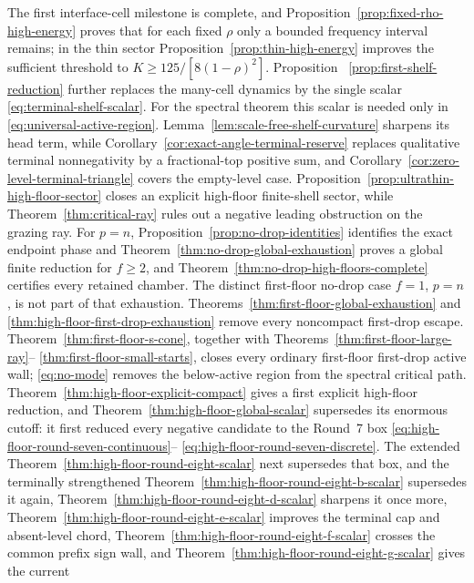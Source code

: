 \documentclass[11pt]{article}
\theoremstyle{remark}
\begin{document}
The first interface-cell milestone is complete, and
Proposition~\ref{prop:fixed-rho-high-energy} proves that for each fixed
$\rho$ only a bounded frequency interval remains; in the thin sector
Proposition~\ref{prop:thin-high-energy} improves the sufficient threshold to
$K\ge 125/[8(1-\rho)^2]$.  Proposition
~\ref{prop:first-shelf-reduction} further replaces the many-cell dynamics
by the single scalar \eqref{eq:terminal-shelf-scalar}.  For the spectral
theorem this scalar is needed only in \eqref{eq:universal-active-region}.
Lemma~\ref{lem:scale-free-shelf-curvature} sharpens its head term, while
Corollary~\ref{cor:exact-angle-terminal-reserve} replaces qualitative
terminal nonnegativity by a fractional-top positive sum, and
Corollary~\ref{cor:zero-level-terminal-triangle} covers the empty-level
case.  Proposition~\ref{prop:ultrathin-high-floor-sector} closes an
explicit high-floor finite-shell sector, while
Theorem~\ref{thm:critical-ray} rules out a negative leading obstruction on
the grazing ray.  For $p=n$, Proposition~\ref{prop:no-drop-identities}
identifies the exact endpoint phase and
 Theorem~\ref{thm:no-drop-global-exhaustion} proves a global finite
 reduction for $f\geq2$, and
 Theorem~\ref{thm:no-drop-high-floors-complete} certifies every retained
 chamber.  The distinct first-floor no-drop case $f=1$, $p=n$, is not part
 of that exhaustion.
 Theorems~\ref{thm:first-floor-global-exhaustion} and
 \ref{thm:high-floor-first-drop-exhaustion} remove every noncompact
 first-drop escape.  Theorem~\ref{thm:first-floor-s-cone}, together with
 Theorems~\ref{thm:first-floor-large-ray}--
 \ref{thm:first-floor-small-starts}, closes every ordinary first-floor
 first-drop active wall; \eqref{eq:no-mode} removes the below-active region from the
 spectral critical path.  Theorem~\ref{thm:high-floor-explicit-compact}
 gives a first explicit high-floor reduction, and
 Theorem~\ref{thm:high-floor-global-scalar} supersedes its enormous cutoff:
 it first reduced every negative candidate to the Round~7 box
 \eqref{eq:high-floor-round-seven-continuous}--
 \eqref{eq:high-floor-round-seven-discrete}.  The extended
 Theorem~\ref{thm:high-floor-round-eight-scalar} next supersedes that box,
 and the terminally strengthened
 Theorem~\ref{thm:high-floor-round-eight-b-scalar} supersedes it again,
 Theorem~\ref{thm:high-floor-round-eight-d-scalar} sharpens it once more,
 Theorem~\ref{thm:high-floor-round-eight-e-scalar} improves the terminal
 cap and absent-level chord,
 Theorem~\ref{thm:high-floor-round-eight-f-scalar} crosses the common
 prefix sign wall, and
 Theorem~\ref{thm:high-floor-round-eight-g-scalar} gives the current
\end{document}
